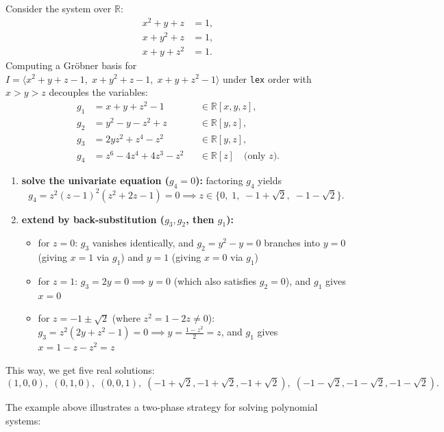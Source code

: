 \documentclass[a4paper, 11pt]{report}
\begin{document}
Consider the system over $\mathbb{R}$:
\begin{align*}
    x^2 + y + z &= 1, \\
    x + y^2 + z &= 1, \\
    x + y + z^2 &= 1.
\end{align*}
Computing a Gröbner basis for $I = \langle x^2 + y + z - 1,\; x + y^2 + z - 1,\; x + y + z^2 - 1 \rangle$ under \texttt{lex} order with $x > y > z$ decouples the variables:
\begin{align*}
    g_1 &= x + y + z^2 - 1 &&\in \mathbb{R}[x, y, z], \\
    g_2 &= y^2 - y - z^2 + z &&\in \mathbb{R}[y, z], \\
    g_3 &= 2yz^2 + z^4 - z^2 &&\in \mathbb{R}[y, z], \\
    g_4 &= z^6 - 4z^4 + 4z^3 - z^2 &&\in \mathbb{R}[z] \quad \text{(only } z\text{)}.
\end{align*}

\begin{enumerate}
    \item \textbf{solve the univariate equation ($g_4 = 0$):} factoring $g_4$ yields
    $$ g_4 = z^2(z - 1)^2(z^2 + 2z - 1) = 0 \implies z \in \{0,\; 1,\; -1 + \sqrt{2},\; -1 - \sqrt{2}\}. $$
    
    \item \textbf{extend by back-substitution ($g_3, g_2$, then $g_1$):}
    \begin{itemize}
        \item for $z = 0$: $g_3$ vanishes identically, and $g_2 = y^2 - y = 0$ branches into $y = 0$ (giving $x = 1$ via $g_1$) and $y = 1$ (giving $x = 0$ via $g_1$)
        \item for $z = 1$: $g_3 = 2y = 0 \implies y = 0$ (which also satisfies $g_2 = 0$), and $g_1$ gives $x = 0$
        \item for $z = -1 \pm \sqrt{2}$ (where $z^2 = 1 - 2z \neq 0$): $g_3 = z^2(2y + z^2 - 1) = 0 \implies y = \tfrac{1 - z^2}{2} = z$, and $g_1$ gives $x = 1 - z - z^2 = z$
    \end{itemize}
\end{enumerate}

This way, we get five real solutions:
$$ (1,0,0),\; (0,1,0),\; (0,0,1),\; (-1+\sqrt{2}, -1+\sqrt{2}, -1+\sqrt{2}),\; (-1-\sqrt{2}, -1-\sqrt{2}, -1-\sqrt{2}). $$

The example above illustrates a two-phase strategy for solving polynomial systems:
\end{document}
